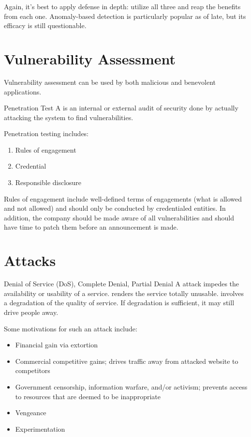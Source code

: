 Again, it's best to apply defense in depth: utilize all three and reap the benefits from each one. Anomaly-based detection is particularly popular as of late, but its efficacy is still questionable.

\section{Vulnerability Assessment}

Vulnerability assessment can be used by both malicious and benevolent applications.

\begin{dfnbox}{Penetration Test}{}
    A  is an internal or external audit of security done by actually attacking the system to find vulnerabilities.
\end{dfnbox}

Penetration testing includes:
\begin{enumerate}
    \item Rules of engagement
    \item Credential
    \item Responsible disclosure
\end{enumerate}

Rules of engagement include well-defined terms of engagements (what is allowed and not allowed) and should only be conducted by credentialed entities. In addition, the company should be made aware of all vulnerabilities and should have time to patch them before an announcement is made.

\section{Attacks}

\begin{dfnbox}{Denial of Service (DoS), Complete Denial, Partial Denial}{}
    A  attack impedes the availability or usability of a service.  renders the service totally unusable.  involves a degradation of the quality of service. If degradation is sufficient, it may still drive people away.
\end{dfnbox}

Some motivations for such an attack include:
\begin{itemize}[noitemsep]
    \item Financial gain via extortion
    \item Commercial competitive gains; drives traffic away from attacked website to competitors
    \item Government censorship, information warfare, and/or activism; prevents access to resources that are deemed to be inappropriate
    \item Vengeance
    \item Experimentation
\end{itemize}

